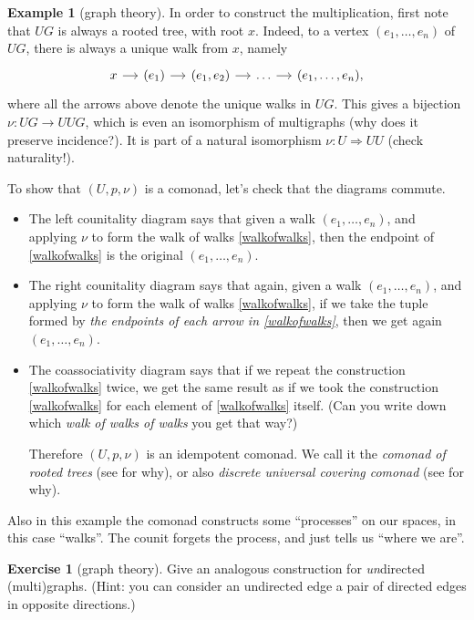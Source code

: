 \documentclass[12pt,oneside]{scrbook}
\numberwithin{equation}{section}
\theoremstyle{plain}
\theoremstyle{definition}
\newtheorem{eg}[thm]{Example}
\newtheorem{ex}[thm]{Exercise}
\newcommand{\ar}[2][]{\arrow{#2}{#1}}
\DeclareMathOperator{\1}{\mathbbm{1}}
\DeclareMathOperator{\2}{\mathbbm{2}}
\begin{document}
\begin{eg}[graph theory]
 In order to construct the multiplication, first note that $UG$ is always a rooted tree, with root $x$. Indeed, to a vertex $(e_1,\dots,e_n)$ of $UG$, there is always a unique walk from $x$, namely
 \begin{equation}\label{walkofwalks}
 \begin{tikzcd}[sep=small]
  x \ar{r} & (e_1) \ar{r} & (e_1,e_2) \ar{r} &\dots \ar{r} & (e_1,\dots,e_n) ,
 \end{tikzcd}
 \end{equation}
 where all the arrows above denote the unique walks in $UG$.
 This gives a bijection $\nu:UG\to UUG$,
 which is even an isomorphism of multigraphs (why does it preserve incidence?). It is part of a natural isomorphism $\nu:U\Rightarrow UU$ (check naturality!).
 
 To show that $(U,p,\nu)$ is a comonad, let's check that the diagrams  commute. 
 \begin{itemize}
  \item The left counitality diagram says that given a walk $(e_1,\dots,e_n)$, and applying $\nu$ to form the walk of walks \eqref{walkofwalks},
  then the endpoint of \eqref{walkofwalks} is the original $(e_1,\dots,e_n)$.
  \item The right counitality diagram says that again, given a walk $(e_1,\dots,e_n)$, and applying $\nu$ to form the walk of walks \eqref{walkofwalks}, if we take the tuple formed by \emph{the endpoints of each arrow in \eqref{walkofwalks}}, then we get again $(e_1,\dots,e_n)$.
  \item The coassociativity diagram says that if we repeat the construction \eqref{walkofwalks} twice, we get the same result as if we took the construction \eqref{walkofwalks} for each element of \eqref{walkofwalks} itself. (Can you write down which \emph{walk of walks of walks} you get that way?)
  
  Therefore $(U,p,\nu)$ is an idempotent comonad. We call it the \emph{comonad of rooted trees} (see  for why), or also \emph{discrete universal covering comonad} (see  for why). 
 \end{itemize}
\end{eg}

Also in this example the comonad constructs some ``processes'' on our spaces, in this case ``walks''. The counit forgets the process, and just tells us ``where we are''.

\begin{ex}[graph theory]\label{ucugraph}
 Give an analogous construction for \emph{un}directed (multi)graphs. (Hint: you can consider an undirected edge a pair of directed edges in opposite directions.)
\end{ex}
\end{document}
